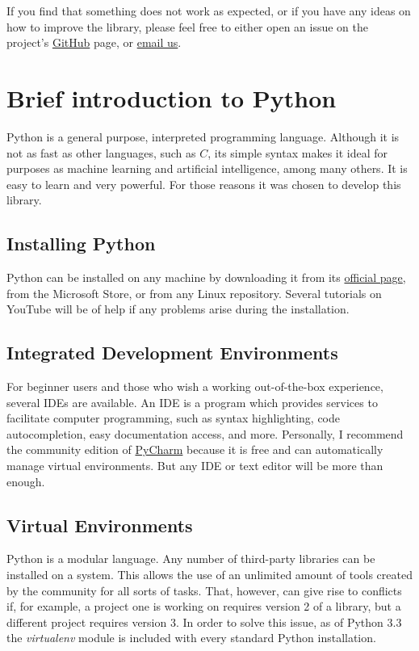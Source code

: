 \documentclass[a4paper,12pt]{article}
\begin{document}
If you find that something does not work as expected, or if you have any ideas on how to improve the library, please feel free to either open an issue on the project's \href{https://github.com/JuodaanViinaa/Laboratorio}{GitHub} page, or \href{mailto:maldonadodaniel96@outlook.com}{email us}.

\newpage
\section{Brief introduction to Python}

Python is a general purpose, interpreted programming language. Although it is not as fast as other languages, such as $C$, its simple syntax makes it ideal for purposes as machine learning and artificial intelligence, among many others. It is easy to learn and very powerful. For those reasons it was chosen to develop this library.

\subsection{Installing Python}

Python can be installed on any machine by downloading it from its \href{https://www.python.org/}{official page}, from the Microsoft Store, or from any Linux repository. Several tutorials on YouTube will be of help if any problems arise during the installation.

\subsection{Integrated Development Environments}

For beginner users and those who wish a working out-of-the-box experience, several IDEs are available. An IDE is a program which provides services to facilitate computer programming, such as syntax highlighting, code autocompletion, easy documentation access, and more. Personally, I recommend the community edition of \href{https://www.jetbrains.com/pycharm/download/}{PyCharm} because it is free and can automatically manage virtual environments. But any IDE or text editor will be more than enough.

\subsection{Virtual Environments}

Python is a modular language. Any number of third-party libraries can be installed on a system. This allows the use of an unlimited amount of tools created by the community for all sorts of tasks. That, however, can give rise to conflicts if, for example, a project one is working on requires version 2 of a library, but a different project requires version 3. In order to solve this issue, as of Python 3.3 the {\slshape virtualenv} module is included with every standard Python installation.
\end{document}
